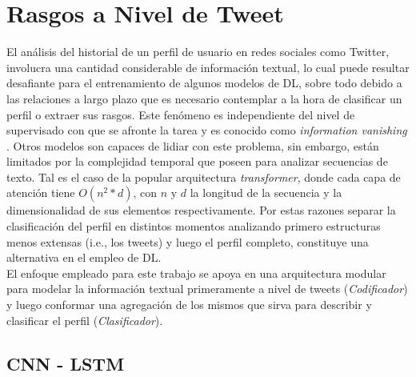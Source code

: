 	\section{Rasgos a Nivel de Tweet}
	
	El análisis del historial de un perfil de usuario en redes sociales como Twitter, involucra una cantidad considerable de información textual, lo cual puede resultar desafiante para el entrenamiento de algunos modelos de DL, sobre todo debido a las relaciones a largo plazo que es necesario contemplar a la hora de clasificar un perfil o extraer sus rasgos.	
	Este fenómeno es independiente del nivel de supervisado con que se afronte la tarea y es conocido como \textit{information vanishing} \citep{hochreiter2001gradient}. Otros modelos son capaces de lidiar con este problema, sin embargo, están limitados por la complejidad temporal que poseen para analizar secuencias de texto. Tal es el caso de la popular arquitectura \textit{transformer}, donde cada capa de atención tiene  $O (n^2*d)$, con $n \text{ y } d$ la longitud de la secuencia y la dimensionalidad de sus elementos respectivamente. 
	Por estas razones separar la clasificación del perfil en distintos momentos analizando primero estructuras menos extensas (i.e., los tweets) y luego el perfil completo, constituye una alternativa en el empleo de DL.\\
	El enfoque empleado para este trabajo se apoya en una arquitectura modular para modelar la información textual primeramente a nivel de tweets  (\textit{Codificador}) y luego conformar una agregación de los mismos que sirva para describir y clasificar el perfil (\textit{Clasificador}).
	
	\subsection{CNN - LSTM}~\label{cnn-lstm}
	
